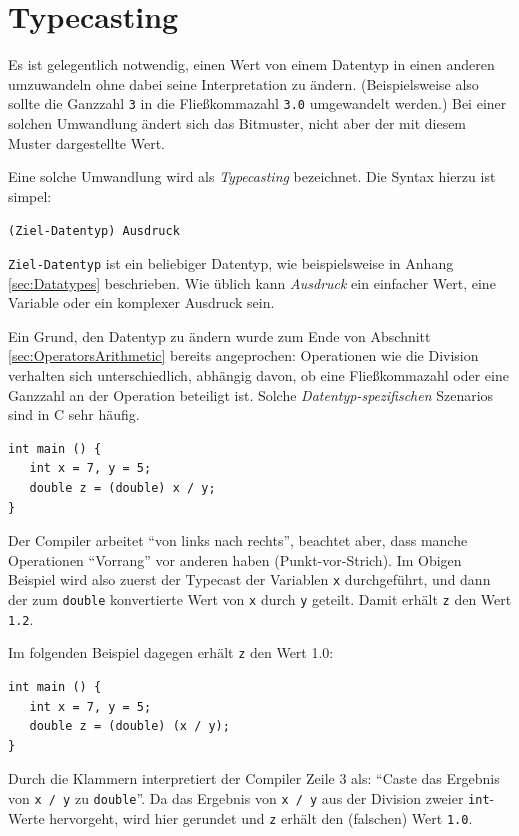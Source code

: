 \section{Typecasting} \label{sec:Casting}
Es ist gelegentlich notwendig, einen Wert von einem Datentyp in einen anderen umzuwandeln ohne dabei seine Interpretation zu ändern. (Beispielsweise also sollte die Ganzzahl \texttt{3} in die Fließkommazahl \texttt{3.0} umgewandelt werden.) Bei einer solchen Umwandlung ändert sich das Bitmuster, nicht aber der mit diesem Muster dargestellte Wert.

Eine solche Umwandlung wird als \emph{Typecasting} bezeichnet. Die Syntax hierzu ist simpel:
\begin{codebox}
\texttt{(Ziel-Datentyp) Ausdruck}
\end{codebox}
\texttt{Ziel-Datentyp} ist ein beliebiger Datentyp, wie beispielsweise in Anhang \ref{sec:Datatypes} beschrieben. Wie üblich kann \emph{Ausdruck} ein einfacher Wert, eine Variable oder ein komplexer Ausdruck sein.

Ein Grund, den Datentyp zu ändern wurde zum Ende von Abschnitt \ref{sec:OperatorsArithmetic} bereits angeprochen: Operationen wie die Division verhalten sich unterschiedlich, abhängig davon, ob eine Fließkommazahl oder eine Ganzzahl an der Operation beteiligt ist. Solche \emph{Datentyp-spezifischen} Szenarios sind in C sehr häufig.

\begin{codebox}
\begin{verbatim}
int main () {
   int x = 7, y = 5;
   double z = (double) x / y;
}
\end{verbatim}
\end{codebox}

\begin{hintbox}
Der Compiler arbeitet \enquote{von links nach rechts}, beachtet aber, dass manche Operationen \enquote{Vorrang} vor anderen haben (\eg Punkt-vor-Strich). Im Obigen Beispiel wird also zuerst der Typecast der Variablen \texttt{x} durchgeführt, und dann der zum \texttt{double} konvertierte Wert von \texttt{x} durch \texttt{y} geteilt. Damit erhält \texttt{z} den Wert \texttt{1.2}.

Im folgenden Beispiel dagegen erhält \texttt{z} den Wert 1.0:
\begin{codebox}
\begin{verbatim}
int main () {
   int x = 7, y = 5;
   double z = (double) (x / y);
}
\end{verbatim}
\end{codebox}
Durch die Klammern interpretiert der Compiler Zeile 3 als: \enquote{Caste das Ergebnis von \texttt{x / y} zu \texttt{double}}. Da das Ergebnis von \texttt{x / y} aus der Division zweier \texttt{int}-Werte hervorgeht, wird hier gerundet und \texttt{z} erhält den (\idR falschen) Wert \texttt{1.0}.
\end{hintbox}

